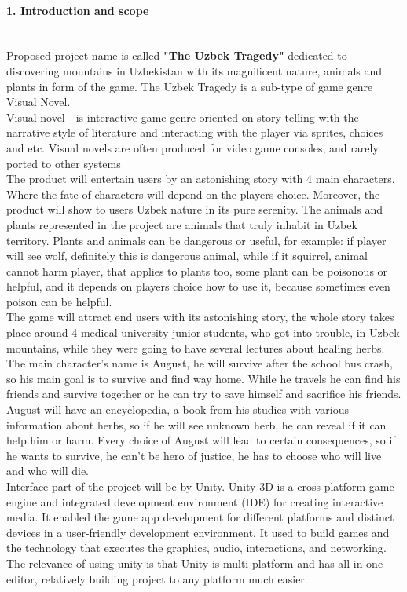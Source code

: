 \documentclass[12pt,a4paper]{article}
\newcommand{\ind}{\indent\indent}
\begin{document}
\paragraph{1. Introduction and scope\\}
\ind \\
\ind Proposed project name is called \textbf{"The Uzbek Tragedy"} dedicated to discovering mountains in Uzbekistan with its magnificent nature, animals and plants in form of the game. The Uzbek Tragedy is a sub-type of game genre Visual Novel. \\
\ind Visual novel - is interactive game genre oriented on story-telling with the narrative style of literature and interacting with the player via sprites, choices and etc. Visual novels are often produced for video game consoles, and rarely ported to other systems\\
\ind The product will entertain users by an astonishing story with 4 main characters. Where the fate of characters will depend on the players choice. Moreover, the product will show to users Uzbek nature in its pure serenity. The animals and plants represented in the project are animals that truly inhabit in Uzbek territory. Plants and animals can be dangerous or useful, for example: if player will see wolf, definitely this is dangerous animal, while if it squirrel, animal cannot harm player, that applies to plants too, some plant can be poisonous or helpful, and it depends on players choice how to use it, because sometimes even poison can be helpful.\\
The game will attract end users with its astonishing story, the whole story takes place around 4 medical university junior students, who got into trouble, in Uzbek mountains, while they were going to have several lectures about healing herbs. The main character's name is August, he will survive after the school bus crash, so his main goal is to survive and find way home. While he travels he can find his friends and survive together or he can try to save himself and sacrifice his friends. August will have an encyclopedia, a book from his studies with various information about herbs, so if he will see unknown herb, he can reveal if it can help him or harm. Every choice of August will lead to certain consequences, so if he wants to survive, he can't be hero of justice, he has to choose who will live and who will die. \\
\ind Interface part of the project will be by Unity. Unity 3D is a cross-platform game engine and integrated development environment (IDE) for creating interactive media. It enabled the game app development for different platforms and distinct devices in a user-friendly development environment. It used to build games and the technology that executes the graphics, audio, interactions, and networking\cite{unity}. The relevance of using unity is that Unity is multi-platform and has all-in-one editor, relatively building project to any platform much easier. 
\end{document}
